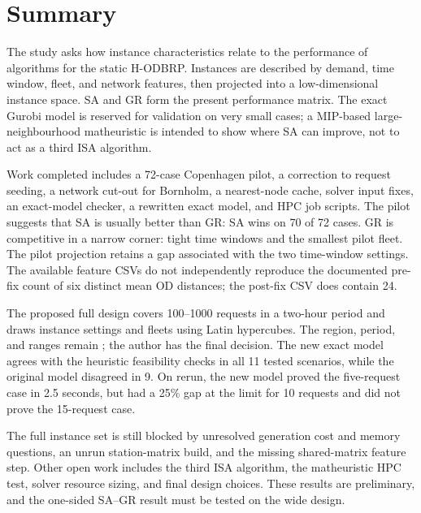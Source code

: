 \section{Summary}

The study asks how instance characteristics relate to the performance of
algorithms for the static H-ODBRP. Instances are described by demand, time
window, fleet, and network features, then projected into a low-dimensional
instance space. SA and GR form the present performance matrix. The exact
Gurobi model is reserved for validation on very small cases; a MIP-based
large-neighbourhood matheuristic is intended to show where SA can improve, not
to act as a third ISA algorithm.

Work completed includes a 72-case Copenhagen pilot, a correction to request
seeding, a network cut-out for Bornholm, a nearest-node cache, solver input
fixes, an exact-model checker, a rewritten exact model, and HPC job scripts.
The pilot suggests that SA is usually better than GR: SA wins on 70 of 72
cases. GR is competitive in a narrow corner: tight time windows and the
smallest pilot fleet. The pilot projection retains a gap associated with the
two time-window settings. The available feature CSVs do not independently
reproduce the documented pre-fix count of six distinct mean OD distances; the
post-fix CSV does contain 24.

The proposed full design covers 100--1000 requests in a two-hour period and
draws instance settings and fleets using Latin hypercubes. The region, period,
and ranges remain \tagprop; the author has the final decision. The new exact
model agrees with the heuristic feasibility checks in all 11 tested
scenarios, while the original model disagreed in 9. On rerun, the new model
proved the five-request case in 2.5 seconds, but had a 25\% gap at the limit
for 10 requests and did not prove the 15-request case.

The full instance set is still blocked by unresolved generation cost and
memory questions, an unrun station-matrix build, and the missing shared-matrix
feature step. Other open work includes the third ISA algorithm, the
matheuristic HPC test, solver resource sizing, and final design choices. These
results are preliminary, and the one-sided SA--GR result must be tested on the
wide design.
